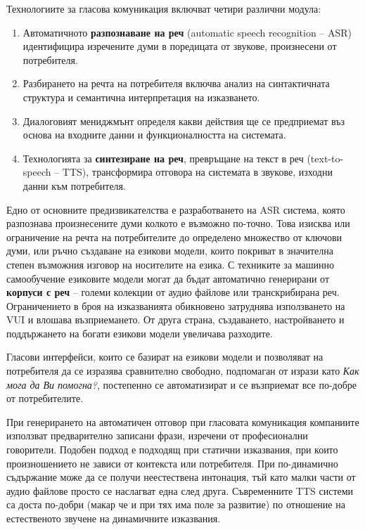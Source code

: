\documentclass[]{../../metanetpaper}
\begin{document}
\begin{multicols}{2}
Технологиите за гласова комуникация включват четири различни модула:

\begin{enumerate}
\item Автоматичното \textbf{разпознаване на реч}  (automatic speech recognition -- ASR)  идентифицира изречените думи в поредицата от звукове, произнесени от потребителя.
\item Разбирането на речта на потребителя включва анализ на синтактичната структура и семантична интерпретация  на изказването.
\item Диалоговият мениджмънт определя какви действия ще се предприемат въз основа на входните данни и функционалността на системата.
\item Технологията за \textbf{синтезиране на реч}, превръщане на текст в
 реч (text-to-speech -- TTS), трансформира отговора на системата в
 звукове, изходни данни към потребителя.
\end{enumerate}

Едно от основните предизвикателства е разработването на ASR система, която разпознава произнесените думи колкото е възможно по-точно. Това изисква или
 ограничение на речта на потребителите до определено множество от ключови думи, или ръчно създаване на езикови модели, които покриват
в значителна степен възможния изговор на носителите на езика.
С техниките за машинно самообучение езиковите модели могат да бъдат автоматично генерирани от \textbf{корпуси с реч} -- големи колекции от аудио файлове или транскрибирана реч.
Ограничението в броя на изказванията обикновено затруднява  използването на VUI  и влошава възприемането. От друга страна, създаването, настройването и поддържането на богати  езикови модели увеличава разходите.
 
Гласови интерфейси, които се базират на езикови модели и позволяват на потребителя да се изразява сравнително свободно, подпомаган от изрази като \textit{Как мога да Ви помогна?}, постепенно се автоматизират и се възприемат все по-добре от потребителите.


При генерирането на автоматичен отговор при гласовата комуникация компаниите използват предварително записани фрази, изречени от професионални говорители. Подобен подход е подходящ при статични изказвания, при които произношението не зависи от контекста или потребителя. При по-динамично съдържание може да се получи неестествена интонация, тъй като  малки части от аудио файлове просто се наслагват една след друга. Съвременните TTS системи са доста по-добри (макар че и при тях  има поле за развитие) по отношение на естественото звучене 
 на динамичните изказвания.


\end{multicols}
\end{document}
